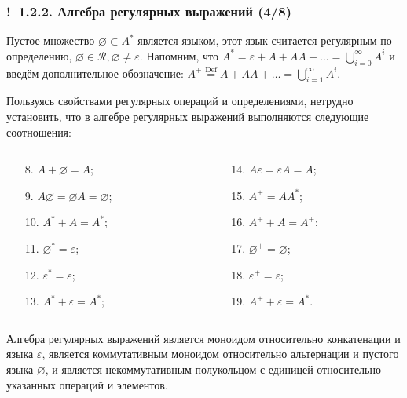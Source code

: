 \documentclass[mathserif,12pt,aspectratio=169]{beamer}
\let\emptyset\varnothing
\def\Def{\stackrel{\text{Def}}{=}}
\let\cal\mathcal
\def\Ok{{\color{green}\textbf{!}\ }}
\begin{document}
\begin{frame}
\frametitle{\Ok 1.2.2. Алгебра регулярных выражений (4/8)}
Пустое множество $\emptyset\subset A^*$ 
является языком, этот язык считается регулярным по определению, $\emptyset\in \cal{R}, \emptyset\ne\varepsilon$. 
Напомним, что $A^*= \varepsilon +A + AA+ \dots =
\bigcup_{i=0}^\infty A^i$ и введём дополнительное обозначение:
$A^+ \Def A + AA+ \dots = \bigcup_{i=1}^\infty A^i$.
  
Пользуясь свойствами регулярных операций и определениями, 
нетрудно установить, что в алгебре 
регулярных выражений
выполняются следующие соотношения:

\vspace{-16pt}
\begin{columns}[t]
\begin{column}{7cm}
\begin{enumerate}
\item[8.] $A+\emptyset = A$;
\item[9.] $A\emptyset = \emptyset A=\emptyset$;
\item[10.] $A^* +A =A^*$;
\item[11.] $\emptyset^*=\varepsilon$;
\item[12.] $\varepsilon^*=\varepsilon$;
\item[13.] $A^* + \varepsilon=A^*$;
\end{enumerate}
\end{column}
\begin{column}{7cm}
\begin{enumerate}
\item[14.] $A\varepsilon = \varepsilon A = A$;
\item[15.] $A^+=AA^*$;
\item[16.] $A^+ + A =A^+$;
\item[17.] $\emptyset^+ = \emptyset$;
\item[18.] $\varepsilon^+=\varepsilon$;
\item[19.] $A^+ + \varepsilon=A^*$.
\end{enumerate}
\end{column}
\end{columns} 

\vspace{2pt}
\begin{remark}
Алгебра регулярных выражений является моноидом относительно конкатенации и языка $\varepsilon$,
является коммутативным моноидом
относительно альтернации и пустого языка
$\emptyset$, и является некоммутативным
полукольцом с единицей относительно 
указанных операций и элементов.  
\end{remark}
\end{frame}
\end{document}
